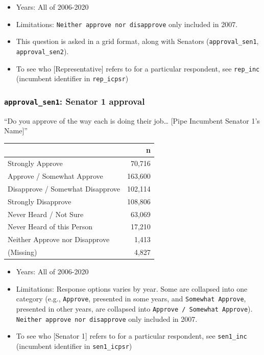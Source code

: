 \documentclass[10pt,article,oneside]{memoir}
\theoremstyle{definition}
\begin{document}
\begin{itemize}
\tightlist
\item
  Years: All of 2006-2020
\item
  Limitations: \texttt{Neither\ approve\ nor\ disapprove} only included
  in 2007.
\item
  This question is asked in a grid format, along with Senators
  (\texttt{approval\_sen1}, \texttt{approval\_sen2}).
\item
  To see who {[}Representative{]} refers to for a particular respondent,
  see \texttt{rep\_inc} (incumbent identifier in \texttt{rep\_icpsr})
\end{itemize}

\hypertarget{approval_sen1-senator-1-approval}{%
\subsubsection{\texorpdfstring{\texttt{approval\_sen1}: Senator 1
approval}{approval\_sen1: Senator 1 approval}}\label{approval_sen1-senator-1-approval}}

``Do you approve of the way each is doing their job\ldots{} {[}Pipe
Incumbent Senator 1's Name{]}''

\begin{table}[H]
\centering
\begin{tabular}{lr}
\toprule
 & n\\
\midrule
Strongly Approve & 70,716\\
Approve / Somewhat Approve & 163,600\\
Disapprove / Somewhat Disapprove & 102,114\\
Strongly Disapprove & 108,806\\
Never Heard / Not Sure & 63,069\\
Never Heard of this Person & 17,210\\
Neither Approve nor Disapprove & 1,413\\
(Missing) & 4,827\\
\bottomrule
\end{tabular}
\end{table}

\begin{itemize}
\tightlist
\item
  Years: All of 2006-2020
\item
  Limitations: Response options varies by year. Some are collapsed into
  one category (e.g., \texttt{Approve}, presented in some years, and
  \texttt{Somewhat\ Approve}, presented in other years, are collapsed
  into \texttt{Approve\ /\ Somewhat\ Approve}).
  \texttt{Neither\ approve\ nor\ disapprove} only included in 2007.
\item
  To see who {[}Senator 1{]} refers to for a particular respondent, see
  \texttt{sen1\_inc} (incumbent identifier in \texttt{sen1\_icpsr})
\end{itemize}
\end{document}
